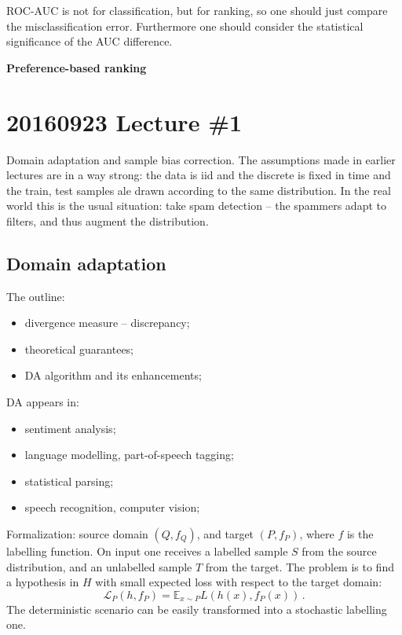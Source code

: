 \documentclass[a4paper]{article}
\newcommand{\ex}{\mathbb{E}}
\begin{document}
ROC-AUC is not for classification, but for ranking, so one should just compare the
misclassification error. Furthermore one should consider the statistical significance
of the AUC difference.

\textbf{Preference-based ranking} 



%

\section{20160923 Lecture \#1} %
\label{sec:20160923_lecture_1}

Domain adaptation and sample bias correction. The assumptions made in earlier lectures
are in a way strong: the data is iid and the discrete is fixed in time and the train,
test samples ale drawn according to the same distribution. In the real world this
is the usual situation: take spam detection -- the spammers adapt to filters, and
thus augment the distribution.

\subsection{Domain adaptation} %
\label{sub:domain_adaptation}

The outline:
\begin{itemize}
    \item divergence measure -- discrepancy;
    \item theoretical guarantees;
    \item DA algorithm and its enhancements;
\end{itemize}
DA appears in: \begin{itemize}
    \item sentiment analysis;
    \item language modelling, part-of-speech tagging;
    \item statistical parsing;
    \item speech recognition, computer vision;
\end{itemize}

Formalization: source domain $(Q, f_Q)$, and target $(P, f_P)$, where $f$ is the
labelling function. On input one receives a labelled sample $S$ from the source
distribution, and an unlabelled sample $T$ from the target. The problem is to
find a hypothesis in $H$ with small expected loss with respect to the target
domain:
\[ \mathcal{L}_P(h, f_P) = \ex_{x\sim P} L(h(x), f_P(x)) \,. \]
The deterministic scenario can be easily transformed into a stochastic labelling
one.
\end{document}
